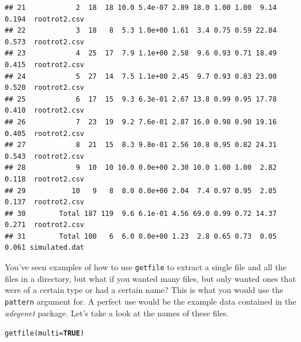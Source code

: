 \documentclass[letterpaper]{article}\usepackage[]{graphicx}\usepackage[]{color}
\makeatletter
\newcommand{\hlnum}[1]{\textcolor[rgb]{0.502,0,0.502}{\textbf{#1}}}%
\newcommand{\hlstd}[1]{\textcolor[rgb]{0,0,0}{#1}}%
\newcommand{\hlkwc}[1]{\textcolor[rgb]{0,0.502,0.753}{#1}}%
\newcommand{\hlkwd}[1]{\textcolor[rgb]{0,0.267,0.4}{#1}}%
\newenvironment{kframe}{%
 \def\at@end@of@kframe{}%
 \ifinner\ifhmode%
  \def\at@end@of@kframe{\end{minipage}}%
  \begin{minipage}{\columnwidth}%
 \fi\fi%
 \def\FrameCommand##1{\hskip\@totalleftmargin \hskip-\fboxsep
 \colorbox{shadecolor}{##1}\hskip-\fboxsep
     \hskip-\linewidth \hskip-\@totalleftmargin \hskip\columnwidth}%
 \MakeFramed {\advance\hsize-\width
   \@totalleftmargin\z@ \linewidth\hsize
   \@setminipage}}%
 {\par\unskip\endMakeFramed%
 \at@end@of@kframe}
\newenvironment{knitrout}{}{} %
\makeatother
\begin{document}
\begin{knitrout}
\begin{kframe}
\begin{verbatim}
## 21            2  18  18 10.0 5.4e-07 2.89 18.0 1.00 1.00  9.14 0.194  rootrot2.csv
## 22            3  18   8  5.3 1.0e+00 1.61  3.4 0.75 0.59 22.84 0.573  rootrot2.csv
## 23            4  25  17  7.9 1.1e+00 2.58  9.6 0.93 0.71 18.49 0.415  rootrot2.csv
## 24            5  27  14  7.5 1.1e+00 2.45  9.7 0.93 0.83 23.00 0.520  rootrot2.csv
## 25            6  17  15  9.3 6.3e-01 2.67 13.8 0.99 0.95 17.78 0.410  rootrot2.csv
## 26            7  23  19  9.2 7.6e-01 2.87 16.0 0.98 0.90 19.16 0.405  rootrot2.csv
## 27            8  21  15  8.3 9.8e-01 2.56 10.8 0.95 0.82 24.31 0.543  rootrot2.csv
## 28            9  10  10 10.0 0.0e+00 2.30 10.0 1.00 1.00  2.82 0.118  rootrot2.csv
## 29           10   9   8  8.0 0.0e+00 2.04  7.4 0.97 0.95  2.85 0.137  rootrot2.csv
## 30        Total 187 119  9.6 6.1e-01 4.56 69.0 0.99 0.72 14.37 0.271  rootrot2.csv
## 31        Total 100   6  6.0 0.0e+00 1.23  2.8 0.65 0.73  0.05 0.061 simulated.dat
\end{verbatim}
\end{kframe}
\end{knitrout}


You've seen examples of how to use \texttt{getfile} to extract a single file and all the files in a directory, but what if you wanted many files, but only wanted ones that were of a certain type or had a certain name? This is what you would use the \texttt{pattern} argument for.
A perfect use would be the example data contained in the \textit{adegenet} package. Let's take a look at the names of these files.
\begin{center}
\end{center}
\begin{knitrout}\footnotesize
{}\color{fgcolor}\begin{kframe}
\begin{alltt}
\hlkwd{getfile}\hlstd{(}\hlkwc{multi} \hlstd{=} \hlnum{TRUE}\hlstd{)}
\end{alltt}
\end{kframe}
\end{knitrout}
\end{document}
